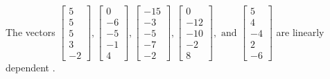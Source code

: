 \begin{exercise}
\begin{exerciseStatement}
  \end{exerciseStatement}
  \begin{exerciseAnswer}
   The vectors \(\left[\begin{array}{r}
5 \\
5 \\
5 \\
3 \\
-2
\end{array}\right] , \left[\begin{array}{r}
0 \\
-6 \\
-5 \\
-1 \\
4
\end{array}\right] , \left[\begin{array}{r}
-15 \\
-3 \\
-5 \\
-7 \\
-2
\end{array}\right] , \left[\begin{array}{r}
0 \\
-12 \\
-10 \\
-2 \\
8
\end{array}\right] , \text{ and } \left[\begin{array}{r}
5 \\
4 \\
-4 \\
2 \\
-6
\end{array}\right]\) are 
  	 linearly dependent  .
  


  \end{exerciseAnswer}
\end{exercise}